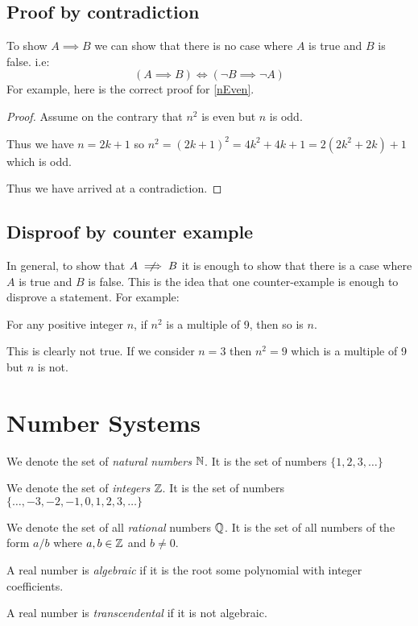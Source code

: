 \documentclass[../main.tex]{subfiles}
\begin{document}
\subsection{Proof by contradiction}
To show $A \implies B$ we can show that there is no case where $A$ is true and $B$ is false. i.e:
\[
  (A \implies B) \iff (\lnot B \implies \lnot A)
\]
For example, here is the correct proof for \cref{nEven}.
\begin{proof}
  Assume on the contrary that $n^2$ is even but $n$ is odd.

  Thus we have $n = 2k + 1$ so $n^2 = (2k + 1)^2 = 4k^2 + 4k + 1 = 2(2k^2 + 2k) + 1$ which is odd.

  Thus we have arrived at a contradiction.
\end{proof}
\subsection{Disproof by counter example}
In general, to show that $A \centernot\implies B$ it is enough to show that there is a case where $A$ is true and $B$ is false.
This is the idea that one counter-example is enough to disprove a statement.
For example:
\begin{proposition}
  For any positive integer $n$, if $n^2$ is a multiple of 9, then so is $n$.
\end{proposition}
This is clearly not true. If we consider $n = 3$ then $n^2 = 9$ which is a multiple of 9 but $n$ is not.
\section{Number Systems}
\begin{definition}
  We denote the set of \textit{natural numbers} $\mathbb{N}$. It is the set of numbers $\{1, 2, 3, \ldots\}$
\end{definition}
\begin{definition}[Integers]
  We denote the set of \textit{integers} $\mathbb{Z}$. It is the set of numbers $\{\ldots, -3, -2, -1 , 0, 1, 2, 3, \ldots\}$
\end{definition}
\begin{definition}
  We denote the set of all \textit{rational} numbers $\mathbb{Q}$. It is the set of all numbers of the form $a/b$ where $a, b \in \mathbb{Z}$ and $b \neq 0$.
\end{definition}
\begin{definition}
  A real number is \textit{algebraic} if it is the root some polynomial with integer coefficients.
\end{definition}
\begin{definition}
  A real number is \textit{transcendental} if it is not algebraic. 
\end{definition}
\end{document}
